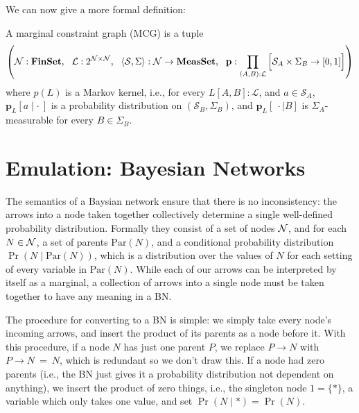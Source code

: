 \documentclass{article}
\begin{document}
	
	
	
	We can now give a more formal definition:
	\begin{defn}\label{def:mcg}
		A marginal constraint graph (MCG) is a tuple 
		\[ \left(\mathcal N : \mathbf{FinSet},~~\mathcal L : 2^{\cal N \times N},~~ \langle\mathcal S, \Sigma\rangle : \mathcal N \to \mathbf{MeasSet}, ~~\mathbf p : \prod_{(A,B): \mathcal L} \left[ \Big. \mathcal S_A \times \Sigma_B \to [0,1]\right] \right) \]
		where $p(L)$ is a Markov kernel, i.e., for every $L[A,B] : \mathcal L$, and $a \in \mathcal S_A$, $\mathbf p_L[a \mid \cdot~]$ is a probability distribution on $(\mathcal S_B, \Sigma_B)$, and $\mathbf p_L[~\cdot \mid B]$ is $\Sigma_A$-measurable for every $B \in \Sigma_B$.
	\end{defn}
		


	\section{Emulation: Bayesian Networks}
	\label{sec:convert2bn}
	The semantics of a Baysian network ensure that there is no inconsistency: the arrows into a node taken together collectively determine a single well-defined probability distribution. Formally they consist of a set of nodes $\cal N$, and for each $N \in \cal N$, a set of parents $\mathrm{Par}(N)$, and a conditional probability distribution $\Pr( N \mid \mathrm{Par}(N))$, which is a distribution over the values of $N$ for each setting of every variable in $\mathrm{Par}(N)$. While each of our arrows can be interpreted by itself as a marginal, a collection of arrows into a single node must be taken together to have any meaning in a BN. 
	
	The procedure for converting to a BN is simple: we simply take every node's incoming arrows, and insert the product of its parents as a node before it. With this procedure, if a node $N$ has just one parent $P$, we replace $P \to N$ with $P \to N ~=~ N$, which is redundant so we don't draw this. If a node had zero parents (i.e., the BN just gives it a probability distribution not dependent on anything), we insert the product of zero things, i.e., the singleton node $1 = \{*\}$, a variable which only takes one value, and set $\Pr(N \mid *) = \Pr(N)$. 
	
\end{document}
